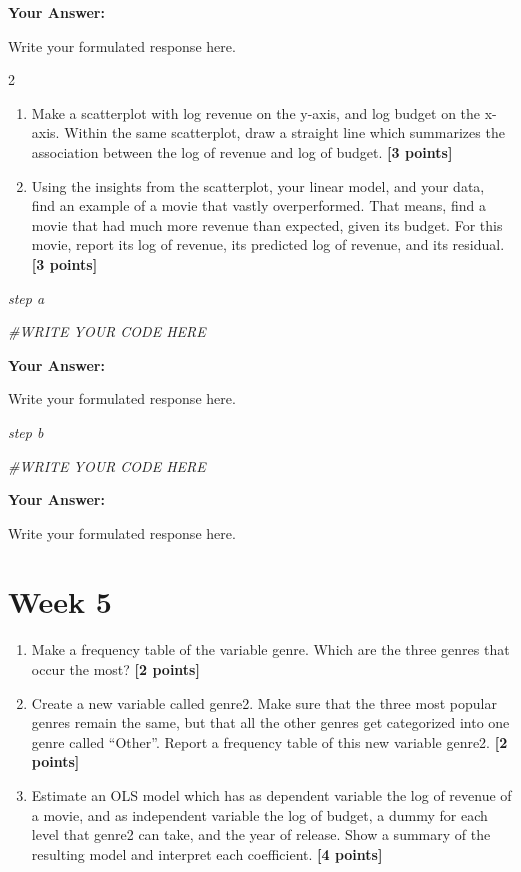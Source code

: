 \documentclass[
]{article}
\newenvironment{Shaded}{\begin{snugshade}}{\end{snugshade}}
\newcommand{\CommentTok}[1]{\textcolor[rgb]{0.56,0.35,0.01}{\textit{#1}}}
\providecommand{\tightlist}{%
  \setlength{\itemsep}{0pt}\setlength{\parskip}{0pt}}
\begin{document}
\textbf{Your Answer:}

Write your formulated response here.

2

\begin{enumerate}
\def\labelenumi{\alph{enumi}.}
\tightlist
\item
  Make a scatterplot with log revenue on the y-axis, and log budget on
  the x-axis. Within the same scatterplot, draw a straight line which
  summarizes the association between the log of revenue and log of
  budget. \textbf{[3 points]}
\item
  Using the insights from the scatterplot, your linear model, and your
  data, find an example of a movie that vastly overperformed. That
  means, find a movie that had much more revenue than expected, given
  its budget. For this movie, report its log of revenue, its predicted
  log of revenue, and its residual. \textbf{[3 points]}
\end{enumerate}

\emph{step a}

\begin{Shaded}
\begin{Highlighting}[]
\CommentTok{\#WRITE YOUR CODE HERE}
\end{Highlighting}
\end{Shaded}

\textbf{Your Answer:}

Write your formulated response here.

\emph{step b}

\begin{Shaded}
\begin{Highlighting}[]
\CommentTok{\#WRITE YOUR CODE HERE}
\end{Highlighting}
\end{Shaded}

\textbf{Your Answer:}

Write your formulated response here.

\section{Week 5}\label{week-5}

\begin{enumerate}
\def\labelenumi{\alph{enumi}.}
\tightlist
\item
  Make a frequency table of the variable genre. Which are the three
  genres that occur the most? \textbf{[2 points]}
\item
  Create a new variable called genre2. Make sure that the three most
  popular genres remain the same, but that all the other genres get
  categorized into one genre called ``Other''. Report a frequency table
  of this new variable genre2. \textbf{[2 points]}
\item
  Estimate an OLS model which has as dependent variable the log of
  revenue of a movie, and as independent variable the log of budget, a
  dummy for each level that genre2 can take, and the year of release.
  Show a summary of the resulting model and interpret each coefficient.
  \textbf{[4 points]}
\end{enumerate}
\end{document}
